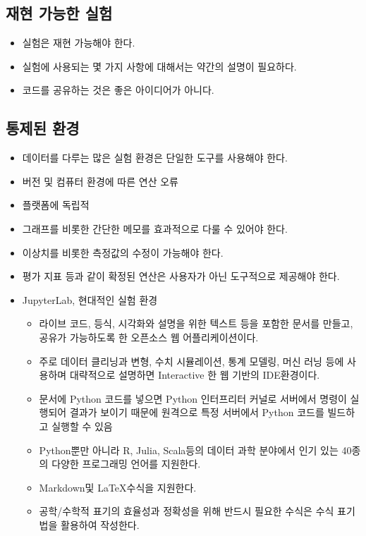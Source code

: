 \documentclass{article}
\begin{document}
\subsection{재현 가능한 실험}
\begin{itemize}
    \item 실험은 재현 가능해야 한다.
    \item 실험에 사용되는 몇 가지 사항에 대해서는 약간의 설명이 필요하다.
    \item 코드를 공유하는 것은 좋은 아이디어가 아니다.
\end{itemize}
\subsection{통제된 환경}
\begin{itemize}
    \item 데이터를 다루는 많은 실험 환경은 단일한 도구를 사용해야 한다.
    \item 버전 및 컴퓨터 환경에 따른 연산 오류
    \item 플랫폼에 독립적
    \item 그래프를 비롯한 간단한 메모를 효과적으로 다룰 수 있어야 한다.
    \item 이상치를 비롯한 측정값의 수정이 가능해야 한다.
    \item 평가 지표 등과 같이 확정된 연산은 사용자가 아닌 도구적으로 제공해야 한다.
    \item JupyterLab, 현대적인 실험 환경
    \begin{itemize}
        \item 라이브 코드, 등식, 시각화와 설명을 위한 텍스트 등을 포함한 문서를 만들고, 공유가 가능하도록 한 오픈소스 웹 어플리케이션이다.
        \item 주로 데이터 클리닝과 변형, 수치 시뮬레이션, 통계 모델링, 머신 러닝 등에 사용하며 대략적으로 설명하면 Interactive 한 웹 기반의 IDE환경이다.
        \item 문서에 Python 코드를 넣으면 Python 인터프리터 커널로 서버에서 명령이 실행되어 결과가 보이기 때문에 원격으로 특정 서버에서 Python 코드를 빌드하고 실행할 수 있음
        \item Python뿐만 아니라 R, Julia, Scala등의 데이터 과학 분야에서 인기 있는 40종의 다양한 프로그래밍 언어를 지원한다.
        \item Markdown및 \LaTeX 수식을 지원한다.
        \item 공학/수학적 표기의 효율성과 정확성을 위해 반드시 필요한 수식은  수식 표기법을 활용하여 작성한다.
    \end{itemize}
\end{itemize}
\end{document}
